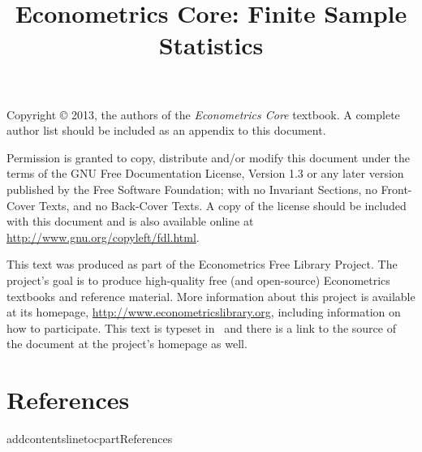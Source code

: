 \documentclass{tex/tufte-handout}
\title{Econometrics Core: Finite Sample Statistics}
\begin{document}
\maketitle

\bigskip\noindent%
Copyright © 2013, the authors of the \textit{Econometrics Core}
textbook.  A complete author list should be included as an appendix to
this document.

Permission is granted to copy, distribute and/or modify this document
under the terms of the GNU Free Documentation License, Version 1.3 or
any later version published by the Free Software Foundation; with no
Invariant Sections, no Front-Cover Texts, and no Back-Cover Texts.  A
copy of the license should be included with this document and is also
available online at \url{http://www.gnu.org/copyleft/fdl.html}.

This text was produced as part of the Econometrics Free Library
Project.  The project's goal is to produce high-quality free (and
open-source) Econometrics textbooks and reference material.  More
information about this project is available at its homepage,
\url{http://www.econometricslibrary.org}, including information on how
to participate.  This text is typeset in \XeLaTeX\ and there is a link
to the source of the document at the project's homepage as well.

\tableofcontents














\part*{References}%
addcontentsline{toc}{part}{References}

\end{document}

